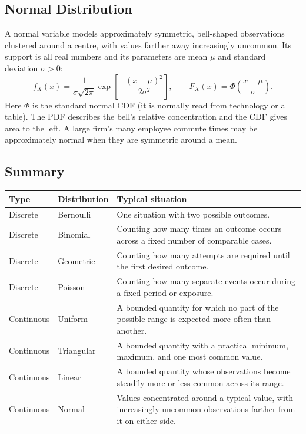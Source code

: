 
	\subsection{Normal Distribution}
	\label{sec:introduction-normal}
	A normal variable models approximately symmetric, bell-shaped observations clustered around a centre, with values farther away increasingly uncommon. Its support is all real numbers and its parameters are mean $\mu$ and standard deviation $\sigma>0$:
	\[
		f_X(x)=\frac{1}{\sigma\sqrt{2\pi}}\exp\!\left[-\frac{(x-\mu)^2}{2\sigma^2}\right],
		\qquad F_X(x)=\Phi\!\left(\frac{x-\mu}{\sigma}\right).
	\]
	Here $\Phi$ is the standard normal CDF (it is normally read from technology or a table). The PDF describes the bell's relative concentration and the CDF gives area to the left. A large firm's many employee commute times may be approximately normal when they are symmetric around a mean.


	\subsection{Summary}
	\label{sec:introduction-summary}

	\noindent
	\begin{tabularx}{\textwidth}{|C{2.5cm}|C{2.8cm}|>{\raggedright\arraybackslash}X|}
		\hline
		\textbf{Type} & \textbf{Distribution} & \textbf{Typical situation} \\
		\hline
		Discrete & Bernoulli & One situation with two possible outcomes. \\
		\hline
		Discrete & Binomial & Counting how many times an outcome occurs across a fixed number of comparable cases. \\
		\hline
		Discrete & Geometric & Counting how many attempts are required until the first desired outcome. \\
		\hline
		Discrete & Poisson & Counting how many separate events occur during a fixed period or exposure. \\
		\hline
		Continuous & Uniform & A bounded quantity for which no part of the possible range is expected more often than another. \\
		\hline
		Continuous & Triangular & A bounded quantity with a practical minimum, maximum, and one most common value. \\
		\hline
		Continuous & Linear & A bounded quantity whose observations become steadily more or less common across its range. \\
		\hline
		Continuous & Normal & Values concentrated around a typical value, with increasingly uncommon observations farther from it on either side. \\
		\hline
	\end{tabularx}

